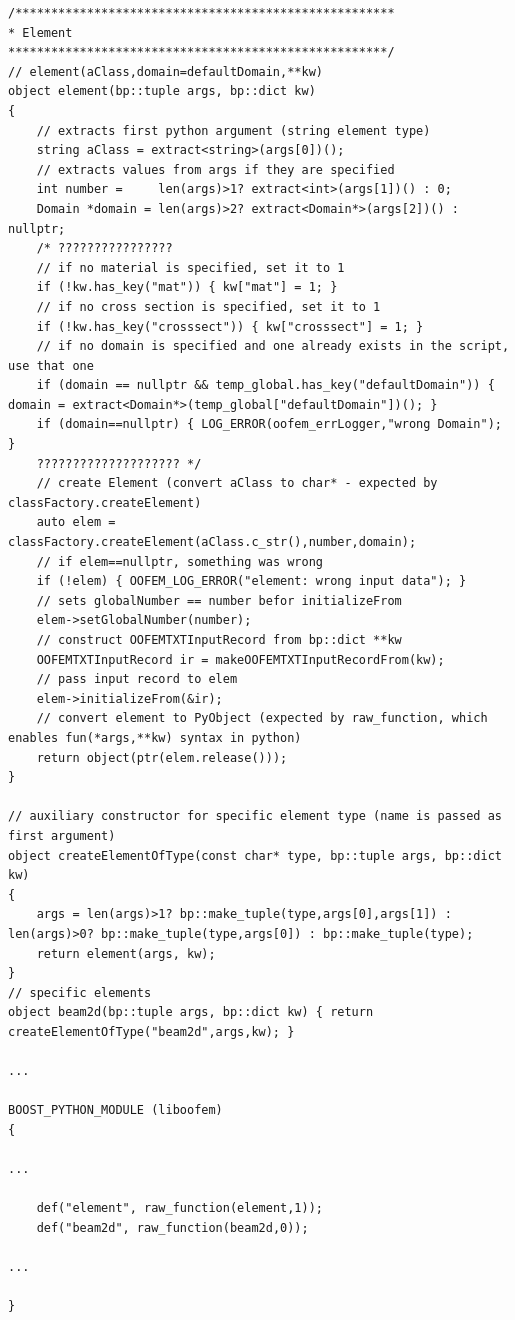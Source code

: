 \documentclass[a4paper,twoside,12pt]{memoir} %
\begin{document}
\begin{lstlisting}[caption={Implementacija omotača oko generalnog konačnog elementa i specifičnog konačnog elementa \textit{beam2d}}]
/*****************************************************
* Element
*****************************************************/
// element(aClass,domain=defaultDomain,**kw)
object element(bp::tuple args, bp::dict kw)
{
    // extracts first python argument (string element type)
    string aClass = extract<string>(args[0])();
    // extracts values from args if they are specified
    int number =     len(args)>1? extract<int>(args[1])() : 0;
    Domain *domain = len(args)>2? extract<Domain*>(args[2])() : nullptr;
    /* ????????????????
    // if no material is specified, set it to 1
    if (!kw.has_key("mat")) { kw["mat"] = 1; }
    // if no cross section is specified, set it to 1
    if (!kw.has_key("crosssect")) { kw["crosssect"] = 1; }
    // if no domain is specified and one already exists in the script, use that one
    if (domain == nullptr && temp_global.has_key("defaultDomain")) { domain = extract<Domain*>(temp_global["defaultDomain"])(); }
    if (domain==nullptr) { LOG_ERROR(oofem_errLogger,"wrong Domain"); }
    ???????????????????? */
    // create Element (convert aClass to char* - expected by classFactory.createElement)
    auto elem = classFactory.createElement(aClass.c_str(),number,domain);
    // if elem==nullptr, something was wrong
    if (!elem) { OOFEM_LOG_ERROR("element: wrong input data"); }
    // sets globalNumber == number befor initializeFrom
    elem->setGlobalNumber(number);
    // construct OOFEMTXTInputRecord from bp::dict **kw
    OOFEMTXTInputRecord ir = makeOOFEMTXTInputRecordFrom(kw);
    // pass input record to elem
    elem->initializeFrom(&ir);
    // convert element to PyObject (expected by raw_function, which enables fun(*args,**kw) syntax in python)
    return object(ptr(elem.release()));
}

// auxiliary constructor for specific element type (name is passed as first argument)
object createElementOfType(const char* type, bp::tuple args, bp::dict kw)
{
    args = len(args)>1? bp::make_tuple(type,args[0],args[1]) : len(args)>0? bp::make_tuple(type,args[0]) : bp::make_tuple(type);
    return element(args, kw);
}
// specific elements
object beam2d(bp::tuple args, bp::dict kw) { return createElementOfType("beam2d",args,kw); }

...

BOOST_PYTHON_MODULE (liboofem)
{

...

    def("element", raw_function(element,1));
    def("beam2d", raw_function(beam2d,0));

...

}
\end{lstlisting}
\end{document}
